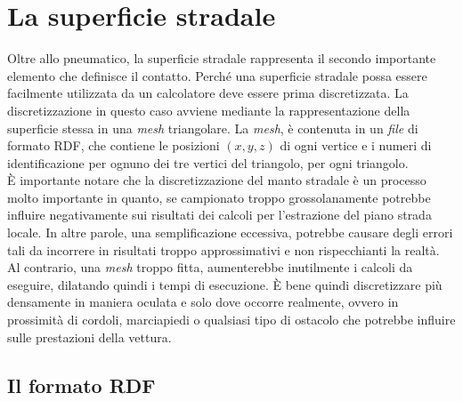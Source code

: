 \chapter{La superficie stradale}
\label{rdf}
%
Oltre allo pneumatico, la superficie stradale rappresenta il secondo importante elemento che definisce il contatto. Perché una superficie stradale possa essere facilmente utilizzata da un calcolatore deve essere prima discretizzata. La discretizzazione in questo caso avviene mediante la rappresentazione della superficie stessa in una \textit{mesh} triangolare. La \textit{mesh}, è contenuta in un \textit{file} di formato \ac{RDF}, che contiene le posizioni $(x,y,z)$ di ogni vertice e i numeri di identificazione per ognuno dei tre vertici del triangolo, per ogni triangolo.\\
\indent
È importante notare che la discretizzazione del manto stradale è un processo molto importante in quanto, se campionato troppo grossolanamente potrebbe influire negativamente sui risultati dei calcoli per l'estrazione del piano strada locale. In altre parole, una semplificazione eccessiva, potrebbe causare degli errori tali da incorrere in risultati troppo approssimativi e non rispecchianti la realtà. Al contrario, una \textit{mesh} troppo fitta, aumenterebbe inutilmente i calcoli da eseguire, dilatando quindi i tempi di esecuzione. È bene quindi discretizzare più densamente in maniera oculata e solo dove occorre realmente, ovvero in prossimità di cordoli, marciapiedi o qualsiasi tipo di ostacolo che potrebbe influire sulle prestazioni della vettura.

\section{Il formato RDF}
%
